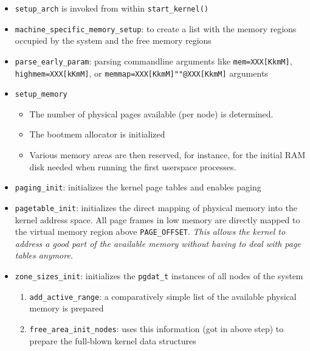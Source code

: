 \begin{itemize}
\item \texttt{setup\_arch} is invoked from within \texttt{start\_kernel()}
\item \texttt{machine\_specific\_memory\_setup}: to create a list with the memory regions occupied by
the system and the free memory regions
\item \texttt{parse\_early\_param}: parsing commandline arguments like \texttt{mem=XXX[KkmM]}, \texttt{highmem=XXX[kKmM]}, or \texttt{memmap=XXX[KkmM]""@XXX[KkmM]} arguments
\item \texttt{setup\_memory}
  \begin{itemize}
  \item The number of physical pages available (per node) is determined.
  \item The bootmem allocator is initialized 
  \item Various memory areas are then reserved, for instance, for the initial RAM disk needed when
   running the first userspace processes.
  \end{itemize}
\item \texttt{paging\_init}: initializes the kernel page tables and enables paging
\item \texttt{pagetable\_init}: initializes the direct mapping of physical memory into the
  kernel address space. All page frames in low memory are directly mapped to the virtual
  memory region above \texttt{PAGE\_OFFSET}. \emph{This allows the kernel to address a
    good part of the available memory without having to deal with page tables anymore}.
\item \texttt{zone\_sizes\_init}: initializes the \texttt{pgdat\_t} instances of all nodes of
  the system
  \begin{enumerate}
  \item \texttt{add\_active\_range}: a comparatively simple list of the available physical
    memory is prepared
  \item \texttt{free\_area\_init\_nodes}: uses this information (got in above step) to
    prepare the full-blown kernel data structures
  \end{enumerate}
\end{itemize}

